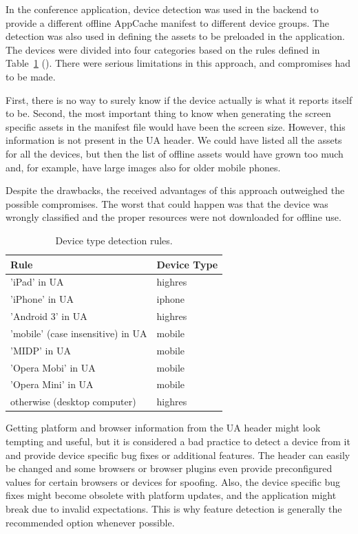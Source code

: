 In the conference application, device detection was used in the
backend to provide a different offline AppCache manifest to different
device groups. The detection was also used in defining the assets to
be preloaded in the application. The devices were divided into four
categories based on the rules defined in
Table~\ref{table:device-detection-rules} (). There were serious limitations in this approach, and
compromises had to be made.

First, there is no way to surely know if the device actually is what
it reports itself to be. Second, the most important thing to know when
generating the screen specific assets in the manifest file would have
been the screen size. However, this information is not present in the
UA header. We could have listed all the assets for all the devices,
but then the list of offline assets would have grown too much and, for
example, have large images also for older mobile phones.

Despite the drawbacks, the received advantages of this approach
outweighed the possible compromises. The worst that could happen was
that the device was wrongly classified and the proper resources were
not downloaded for offline use.

\begin{table}
  \begin{tabular}{ l | l }
    \textbf{Rule} & \textbf{Device Type} \\ \hline
    'iPad' in UA & highres \\
    'iPhone' in UA & iphone \\
    'Android 3' in UA & highres \\
    'mobile' (case insensitive) in UA & mobile \\
    'MIDP' in UA & mobile \\
    'Opera Mobi' in UA & mobile \\
    'Opera Mini' in UA & mobile \\
    otherwise (desktop computer) & highres
  \end{tabular}
  \label{table:device-detection-rules}
  \caption{Device type detection rules.}
\end{table}

Getting platform and browser information from the UA header might look
tempting and useful, but it is considered a bad practice to detect a
device from it and provide device specific bug fixes or additional
features. The header can easily be changed and some browsers or
browser plugins even provide preconfigured values for certain browsers
or devices for spoofing. Also, the device specific bug fixes might
become obsolete with platform updates, and the application might break
due to invalid expectations. This is why feature detection is
generally the recommended option whenever possible.

